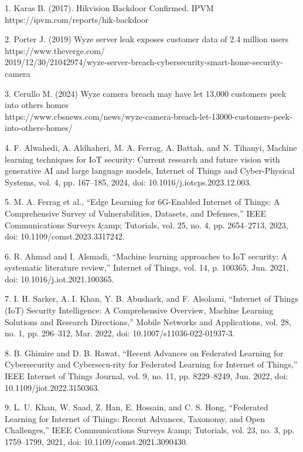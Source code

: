 \begin{noparindent}

1. Karas B. (2017). Hikvision Backdoor Confirmed. IPVM
https://ipvm.com/reports/hik-backdoor

2. Porter J. (2019) Wyze server leak exposes customer data of 2.4
million users
https://www.theverge.com/\\2019/12/30/21042974/wyze-server-breach-cybersecurity-smart-home-security-camera

3. Cerullo M. (2024) Wyze camera breach may have let 13,000 customers
peek into others\textquotesingle{} homes
\\https://www.cbsnews.com/news/wyze-camera-breach-let-13000-customers-peek-into-others-homes/

4. F. Alwahedi, A. Aldhaheri, M. A. Ferrag, A. Battah, and N. Tihanyi,
Machine learning techniques for IoT security: Current research and
future vision with generative AI and large language models, Internet of
Things and Cyber-Physical Systems, vol. 4, pp. 167--185, 2024, doi:
10.1016/j.iotcps.2023.12.003.

5. M. A. Ferrag et al., ``Edge Learning for 6G-Enabled Internet of
Things: A Comprehensive Survey of Vulnerabilities, Datasets, and
Defenses,'' IEEE Communications Surveys \&amp; Tutorials, vol. 25, no.
4, pp. 2654--2713, 2023, doi: 10.1109/comst.2023.3317242.

6. R. Ahmad and I. Alsmadi, ``Machine learning approaches to IoT
security: A systematic literature review,'' Internet of Things, vol. 14,
p. 100365, Jun. 2021, doi: 10.1016/j.iot.2021.100365.

7. I. H. Sarker, A. I. Khan, Y. B. Abushark, and F. Alsolami, ``Internet
of Things (IoT) Security Intelligence: A Comprehensive Overview, Machine
Learning Solutions and Research Directions,'' Mobile Networks and
Applications, vol. 28, no. 1, pp. 296--312, Mar. 2022, doi:
10.1007/s11036-022-01937-3.

8. B. Ghimire and D. B. Rawat, ``Recent Advances on Federated Learning
for Cybersecurity and Cybersecu-rity for Federated Learning for Internet
of Things,'' IEEE Internet of Things Journal, vol. 9, no. 11, pp.
8229--8249, Jun. 2022, doi: 10.1109/jiot.2022.3150363.

9. L. U. Khan, W. Saad, Z. Han, E. Hossain, and C. S. Hong, ``Federated
Learning for Internet of Things: Recent Advances, Taxonomy, and Open
Challenges,'' IEEE Communications Surveys \&amp; Tutorials, vol. 23, no.
3, pp. 1759--1799, 2021, doi: 10.1109/comst.2021.3090430.


\end{noparindent}
